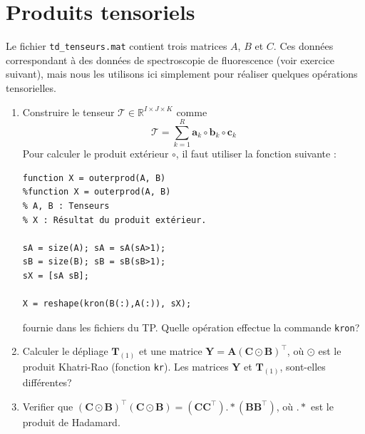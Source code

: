 \section{Produits tensoriels}
Le fichier \texttt{td\_tenseurs.mat} contient trois matrices $A$, $B$ et $C$. Ces données correspondant à des données de spectroscopie de fluorescence (voir exercice suivant), mais nous les utilisons ici simplement pour réaliser quelques opérations tensorielles.
\begin{enumerate}
\item Construire le tenseur $\mathcal{T} \in \mathbb{R}^{I \times J \times K}$ comme 
\[
\mathcal{T} = \sum_{k=1}^{R} \mathbf{a}_k \circ  \mathbf{b}_k  \circ  \mathbf{c}_k 
\]
Pour calculer le  produit extérieur $\circ$, il faut utiliser la fonction suivante :
\begin{lstlisting}
function X = outerprod(A, B)
%function X = outerprod(A, B)
% A, B : Tenseurs
% X : Résultat du produit extérieur.

sA = size(A); sA = sA(sA>1);
sB = size(B); sB = sB(sB>1);
sX = [sA sB];

X = reshape(kron(B(:),A(:)), sX);
\end{lstlisting}
fournie dans les fichiers du TP. Quelle opération effectue la commande \texttt{kron}?

\item   Calculer le dépliage $\mathbf{T}_{(1)}$ et une matrice $\mathbf{Y} = \mathbf{A} (\mathbf{C} \odot \mathbf{B})^{\top}$, où $\odot$ est le produit Khatri-Rao (fonction {\tt kr}). Les matrices $\mathbf{Y}$ et  $\mathbf{T}_{(1)}$, sont-elles différentes?

\item Verifier que $(\mathbf{C} \odot \mathbf{B})^{\top}(\mathbf{C} \odot \mathbf{B}) = (\mathbf{C}\mathbf{C}^{\top}) {.\ast} (\mathbf{B}\mathbf{B}^{\top})$, où $.\ast$ est le produit de Hadamard.

\end{enumerate}
